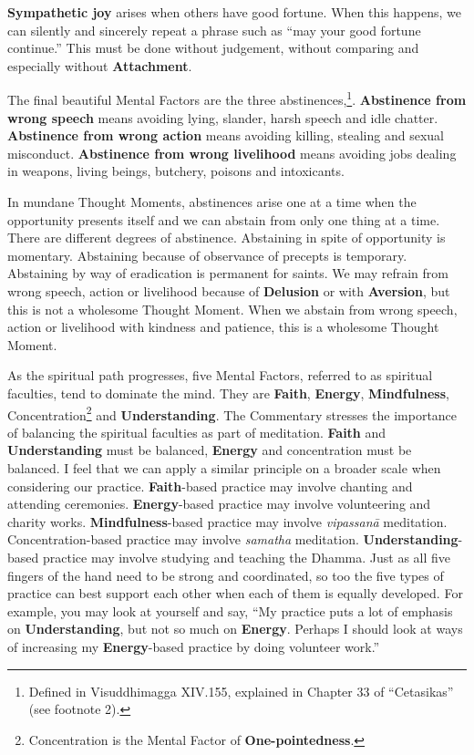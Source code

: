 \textbf{Sympathetic joy} arises when others have good fortune. When this happens, we can silently and sincerely repeat a phrase such as “may your good fortune continue.” This must be done without judgement, without comparing and especially without \textbf{Attachment}.

The final beautiful Mental Factors are the three abstinences,\footnote{Defined in Visuddhimagga XIV.155, explained in Chapter 33 of “Cetasikas” (see footnote 2).}. \textbf{Abstinence from wrong speech} means avoiding lying, slander, harsh speech and idle chatter. \textbf{Abstinence from wrong action} means avoiding killing, stealing and sexual misconduct. \textbf{Abstinence from wrong livelihood} means avoiding jobs dealing in weapons, living beings, butchery, poisons and intoxicants. 

In mundane Thought Moments, abstinences arise one at a time when the opportunity presents itself and we can abstain from only one thing at a time. There are different degrees of abstinence. Abstaining in spite of opportunity is momentary. Abstaining because of observance of precepts is temporary. Abstaining by way of eradication is permanent for saints. We may refrain from wrong speech, action or livelihood because of \textbf{Delusion} or with \textbf{Aversion}, but this is not a wholesome Thought Moment. When we abstain from wrong speech, action or livelihood with kindness and patience, this is a wholesome Thought Moment.

As the spiritual path progresses, five Mental Factors, referred to as spiritual faculties, tend to dominate the mind. They are \textbf{Faith}, \textbf{Energy}, \textbf{Mindfulness}, Concentration\footnote{Concentration is the Mental Factor of \textbf{One-pointedness}.} and \textbf{Understanding}. The Commentary stresses the importance of balancing the spiritual faculties as part of meditation. \textbf{Faith} and \textbf{Understanding} must be balanced, \textbf{Energy} and concentration must be balanced. I feel that we can apply a similar principle on a broader scale when considering our practice. \textbf{Faith}-based practice may involve chanting and attending ceremonies. \textbf{Energy}-based practice may involve volunteering and charity works. \textbf{Mindfulness}-based practice may involve \textit{vipassanā} meditation. Concentration-based practice may involve \textit{samatha} meditation. \textbf{Understanding}-based practice may involve studying and teaching the Dhamma. Just as all five fingers of the hand need to be strong and coordinated, so too the five types of practice can best support each other when each of them is equally developed. For example, you may look at yourself and say, “My practice puts a lot of emphasis on \textbf{Understanding}, but not so much on \textbf{Energy}. Perhaps I should look at ways of increasing my \textbf{Energy}-based practice by doing volunteer work.”

